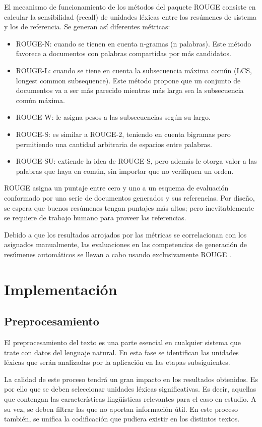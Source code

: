 \documentclass[a4paper]{article}
\begin{document}
El mecanismo de funcionamiento de los métodos del paquete ROUGE consiste en calcular la sensibilidad (recall) de unidades léxicas entre los resúmenes de sistema y los de referencia. Se generan así diferentes métricas:
\begin{itemize}
\item ROUGE-N: cuando se tienen en cuenta n-gramas (n palabras). Este método favorece a documentos con palabras compartidas por más candidatos.
\item ROUGE-L: cuando se tiene en cuenta la subsecuencia máxima común (LCS, longest common subsequence). Este método propone que un conjunto de documentos va a ser más parecido mientras más larga sea la subsecuencia común máxima.
\item ROUGE-W: le asigna pesos a las subsecuencias según su largo.
\item ROUGE-S: es similar a ROUGE-2, teniendo en cuenta bigramas pero permitiendo una cantidad arbitraria de espacios entre palabras.
\item ROUGE-SU: extiende la idea de ROUGE-S, pero además le otorga valor a las palabras que haya en común, sin importar que no verifiquen un orden.
\end{itemize}

ROUGE asigna un puntaje entre cero y uno a un esquema de evaluación conformado por una serie de documentos generados y sus referencias. Por diseño, se espera que buenos resúmenes tengan puntajes más altos; pero inevitablemente se requiere de trabajo humano para proveer las referencias.

Debido a que los resultados arrojados por las métricas se correlacionan con los asignados manualmente, las evaluaciones en las competencias de generación de resúmenes automáticos se llevan a cabo usando exclusivamente ROUGE \cite{mihalcea-tarau}.


\section{Implementación}
\subsection{Preprocesamiento}
El preprocesamiento del texto es una parte esencial en cualquier sistema que trate con datos del lenguaje natural. En esta fase se identifican las unidades léxicas que serán analizadas por la aplicación en las etapas subsiguientes. 

La calidad de este proceso tendrá un gran impacto en los resultados obtenidos. Es por ello que se deben seleccionar unidades léxicas significativas. Es decir, aquellas que contengan las características lingüísticas relevantes para el caso en estudio. A su vez, se deben filtrar las que no aportan información útil. En este proceso también, se unifica la codificación que pudiera existir en los distintos textos.
\end{document}

